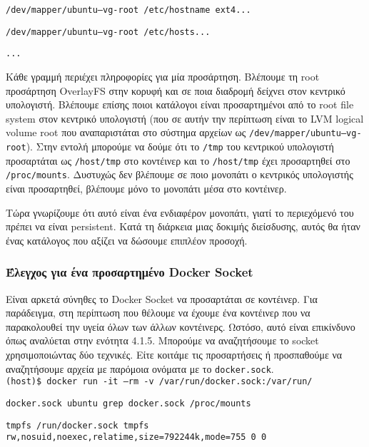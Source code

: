 \texttt{\textlatin{/dev/mapper/ubuntu--vg-root /etc/hostname ext4...}}

\texttt{\textlatin{/dev/mapper/ubuntu--vg-root /etc/hosts...}}

\texttt{\textlatin{...}}



Κάθε γραμμή περιέχει πληροφορίες για μία προσάρτηση.
Βλέπουμε τη \textlatin{root} προσάρτηση \textlatin{OverlayFS} στην κορυφή και σε
ποια διαδρομή δείχνει στον κεντρικό υπολογιστή. Βλέπουμε επίσης ποιοι κατάλογοι
είναι προσαρτημένοι από το \textlatin{root file system} στον κεντρικό υπολογιστή
(που σε αυτήν την περίπτωση είναι το \textlatin{LVM logical volume root} που
αναπαριστάται στο σύστημα αρχείων ως
\texttt{\textlatin{/dev/mapper/ubuntu--vg-root}}). Στην εντολή μπορούμε να δούμε
ότι το \texttt{\textlatin{/tmp}} του κεντρικού υπολογιστή προσαρτάται ως
\texttt{\textlatin{/host/tmp}} στο κοντέινερ και το 
\texttt{\textlatin{/host/tmp}} έχει προσαρτηθεί στο
\texttt{\textlatin{/proc/mounts}}. Δυστυχώς δεν βλέπουμε σε ποιο μονοπάτι ο
κεντρικός υπολογιστής είναι προσαρτηθεί, βλέπουμε μόνο το μονοπάτι μέσα στο
κοντέινερ.

Τώρα γνωρίζουμε ότι αυτό είναι ένα ενδιαφέρον μονοπάτι, γιατί το περιεχόμενό του
πρέπει να είναι \textlatin{persistent}. Κατά τη διάρκεια μιας δοκιμής
διείσδυσης, αυτός θα ήταν ένας κατάλογος που αξίζει να δώσουμε επιπλέον
προσοχή.


\subsubsection{Έλεγχος για ένα προσαρτημένο \textlatin{Docker Socket}}


Είναι αρκετά σύνηθες το \textlatin{Docker Socket} να προσαρτάται σε κοντέινερ.
Για παράδειγμα, στη περίπτωση που θέλουμε να έχουμε ένα κοντέινερ που να
παρακολουθεί την υγεία όλων των άλλων κοντέινερς. Ωστόσο, αυτό είναι επικίνδυνο
όπως αναλύεται στην ενότητα 4.1.5. Μπορούμε να αναζητήσουμε το
\textlatin{socket} χρησιμοποιώντας δύο τεχνικές. Είτε κοιτάμε τις προσαρτήσεις
ή προσπαθούμε να αναζητήσουμε αρχεία με παρόμοια ονόματα με το
\texttt{\textlatin{docker.sock}}. \\

\texttt{\textlatin{(host)\$ docker run -it --rm -v /var/run/docker.sock:/var/run/}}

\texttt{\textlatin{docker.sock ubuntu grep docker.sock /proc/mounts}}

\texttt{\textlatin{tmpfs /run/docker.sock tmpfs rw,nosuid,noexec,relatime,size=792244k,mode=755 0 0}} \\

